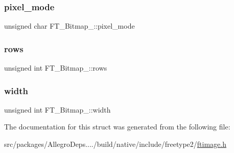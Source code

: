 \mbox{\label{struct_f_t___bitmap___a9bf1180f0b73c4161305ff0166f2652f}} 
\subsubsection{\texorpdfstring{pixel\+\_\+mode}{pixel\_mode}}
{\footnotesize\ttfamily unsigned char F\+T\+\_\+\+Bitmap\+\_\+\+::pixel\+\_\+mode}

\mbox{\label{struct_f_t___bitmap___ad857f33f4d12be88746072a7e1455270}} 
\subsubsection{\texorpdfstring{rows}{rows}}
{\footnotesize\ttfamily unsigned int F\+T\+\_\+\+Bitmap\+\_\+\+::rows}

\mbox{\label{struct_f_t___bitmap___a4a3dd62109eb0371f4ca8d196f713e4b}} 
\subsubsection{\texorpdfstring{width}{width}}
{\footnotesize\ttfamily unsigned int F\+T\+\_\+\+Bitmap\+\_\+\+::width}



The documentation for this struct was generated from the following file\+:\begin{DoxyCompactItemize}
\item 
src/packages/\+Allegro\+Deps..../build/native/include/freetype2/\hyperlink{ftimage_8h}{ftimage.\+h}\end{DoxyCompactItemize}
